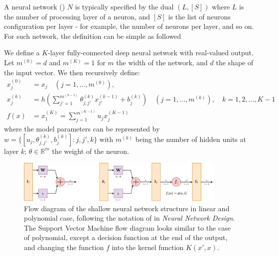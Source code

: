 \documentclass[10pt]{article} %
\begin{document}
A neural network (\cite{goodfellow2016deep,zhang2023mathematical}) $N$ is typically specified by the dual $(L,[S])$ where $L$ is the number of processing layer of a neuron, and $[S]$ is the list of neurons configuration per layer - for example, the number of neurons per layer, and so on. For such network, the definition can be simple as followed 

\begin{definition}
    We define a $K$-layer fully-connected deep neural network with real-valued output. Let $m^{(0)}=d$ and $m^{(K)}=1$ for $m$ the width of the network, and $d$ the shape of the input vector. We then recursively define: 
\begin{align}
    x_{j}^{(0)} &= x_{j} \quad (j=1,\dots,m^{(0)}),\\ 
    x_{j}^{(k)} &= h\left(\sum^{m^{(k-1)}}_{j'=1} \theta_{j,j'}^{(k)}x_{j'}^{(k-1)}+ b_{j}^{(k)}\right)\quad (j=1,\dots,m^{(k)}), \quad k = 1,2,\dots,K-1\\
    f(x) & = x_{1}^{(K)} = \sum^{m^{(K-1)}}_{j=1} u_{j}x_{j}^{(K-1)}
\end{align}
where the model parameters can be represented by $w=\{[u_{j}, \theta_{j,j'}^{(k)}, b_{j}^{(k)}]: j,j',k\}$ with $m^{(k)}$ being the number of hidden units at layer $k$; $\theta\in \mathbb{R}^{m}$ the weight of the neuron.
\end{definition}

\begin{figure}[htb]
    \centering
    \includegraphics[width=0.9\textwidth]{structure_network_1.png}
    \caption{Flow diagram of the shallow neural network structure in linear and polynomial case, following the notation of \cite{10.5555/2721661} in \textit{Neural Network Design}. The Support Vector Machine flow diagram looks similar to the case of polynomial, except a decision function at the end of the output, and changing the function $f$ into the kernel function $K(x',x)$.}
\end{figure}
\end{document}
